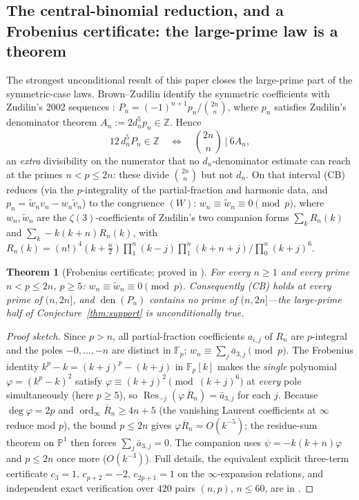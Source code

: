 \documentclass[11pt]{article}
\newtheorem{theorem}{Theorem}[section]
\theoremstyle{definition}
\newcommand{\dn}[1]{d_{#1}}
\newcommand{\ord}{\operatorname{ord}}
\newcommand{\den}{\operatorname{den}}
\newcommand{\Z}{\mathbb{Z}}
\newcommand{\Fbb}{\mathbb{F}}
\newcommand{\PP}{\mathbb{P}}
\newcommand{\Res}{\operatorname{Res}}
\newcommand{\wt}{\widetilde}
\begin{document}
\subsection{The central-binomial reduction, and a Frobenius certificate:
the large-prime law is a theorem}\label{sec:cbcert}

The strongest unconditional result of this paper closes the large-prime
part of the symmetric-case laws. Brown--Zudilin identify the symmetric
coefficients with Zudilin's 2002 sequences \cite{Zud02}:
$P_n=(-1)^{n+1}p_n/\binom{2n}{n}$, where $p_n$ satisfies Zudilin's
denominator theorem $A_n:=2\dn{n}^5 p_n\in\Z$. Hence
\[
12\,\dn{n}^5P_n\in\Z
\quad\Longleftrightarrow\quad
\binom{2n}{n}\ \Big|\ 6A_n ,
\tag{CB}
\]
an \emph{extra} divisibility on the numerator that no
$\dn{n}$-denominator estimate can reach at the primes $n<p\le 2n$: these
divide $\binom{2n}{n}$ but not $\dn{n}$. On that interval (CB) reduces
(via the $p$-integrality of the partial-fraction and harmonic data, and
$p_n=\wt w_n v_n-w_n\wt v_n$) to the congruence $(W)$:
$w_n\equiv\wt w_n\equiv0\pmod p$, where $w_n,\wt w_n$ are the
$\zeta(3)$-coefficients of Zudilin's two companion forms
$\sum_k R_n(k)$ and $\sum_k -k(k+n)R_n(k)$, with
$R_n(k)=(n!)^4(k+\tfrac n2)\prod_1^n(k-j)\prod_1^n(k+n+j)/\prod_0^n(k+j)^6$.

\begin{theorem}[Frobenius certificate; proved in \cite{CBcert}]
\label{thm:cbcert}
For every $n\ge1$ and every prime $n<p\le2n$, $p\ge5$:
$w_n\equiv\wt w_n\equiv0\pmod p$. Consequently \textup{(CB)} holds at
every prime of $(n,2n]$, and $\den(P_n)$ contains no prime of
$(n,2n]$---the large-prime half of
Conjecture~\textup{\ref{thm:support}} is unconditionally true.
\end{theorem}

\begin{proof}[Proof sketch]
Since $p>n$, all partial-fraction coefficients $a_{i,j}$ of $R_n$ are
$p$-integral and the poles $-0,\dots,-n$ are distinct in $\Fbb_p$;
$w_n\equiv\sum_j\bar a_{3,j}\pmod p$. The Frobenius identity
$k^p-k=(k+j)^p-(k+j)$ in $\Fbb_p[k]$ makes the \emph{single} polynomial
$\varphi=(k^p-k)^2$ satisfy $\varphi\equiv(k+j)^2\pmod{(k+j)^6}$ at
\emph{every} pole simultaneously (here $p\ge5$), so
$\Res_{-j}(\varphi\,\overline R_n)=\bar a_{3,j}$ for each $j$. Because
$\deg\varphi=2p$ and $\ord_\infty\overline R_n\ge4n+5$ (the vanishing
Laurent coefficients at $\infty$ reduce mod $p$), the bound $p\le 2n$
gives $\varphi\overline R_n=O(k^{-5})$; the residue-sum theorem on
$\PP^1$ then forces $\sum_j\bar a_{3,j}=0$. The companion uses
$\psi=-k(k+n)\varphi$ and $p\le2n$ once more ($O(k^{-3})$). Full details,
the equivalent explicit three-term certificate
$c_3=1,\,c_{p+2}=-2,\,c_{2p+1}=1$ on the $\infty$-expansion relations,
and independent exact verification over $420$ pairs $(n,p)$, $n\le60$,
are in \cite{CBcert}.
\end{proof}
\end{document}
